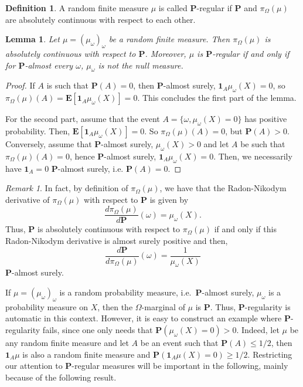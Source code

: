 \documentclass{amsart}
\newtheorem{lem}[thm]{Lemma}
\theoremstyle{definition}
\newtheorem{defn}[thm]{Definition}
\theoremstyle{remark}
\newtheorem{rem}[thm]{Remark}
\begin{document}
\begin{defn}
A random finite measure $\mu$ is called $\mathbf P$-regular if $\mathbf P$ and $\pi_\Omega(\mu)$ are absolutely continuous with respect to each other.
\end{defn}


\begin{lem}
Let $\mu=(\mu_\omega)_\omega$ be a random finite measure.
Then $\pi_\Omega(\mu)$ is absolutely continuous with respect to $\mathbf P$.
Moreover, $\mu$ is $\mathbf P$-regular if and only if for $\mathbf P$-almost every $\omega$, $\mu_\omega$ is not the null measure.
\end{lem}

\begin{proof}
If $A$ is  such that $\mathbf P(A)=0$, then $\mathbf P$-almost surely, $\mathbf 1_A \mu_\omega(X)=0$, so $\pi_\Omega(\mu)(A)=\mathbf E[\mathbf 1_A\mu_\omega(X)]=0$.
This concludes the first part of the lemma.

For the second part, assume that the event $A=\{\omega,\mu_\omega(X)=0\}$ has positive probability.
Then, $\mathbf E[\mathbf 1_A \mu_\omega(X)]=0$.
So $\pi_\Omega(\mu)(A)=0$, but $\mathbf P(A)>0$.
Conversely, assume that $\mathbf{P}$-almost surely, $\mu_\omega(X)>0$ and let $A$ be such that
$\pi_\Omega(\mu)(A)=0$, hence $\mathbf P$-almost surely, $\mathbf 1_A \mu_\omega(X)=0$.
Then, we necessarily have $\mathbf 1_A=0$ $\mathbf P$-almost surely, i.e. $\mathbf P(A)=0$. 
\end{proof}

\begin{rem}
In fact, by definition of $\pi_\Omega(\mu)$, we have that the Radon-Nikodym derivative of $\pi_\Omega(\mu)$ with respect to $\mathbf P$ is given by
$$\frac{d\pi_\Omega(\mu)}{d\mathbf P}(\omega)=\mu_\omega(X).$$
Thus, $\mathbf P$ is absolutely continuous with respect to $\pi_\Omega(\mu)$ if and only if this Radon-Nikodym derivative is almost surely positive and then,
$$\frac{d\mathbf P}{d\pi_\Omega(\mu)}(\omega)=\frac{1}{\mu_\omega(X)}$$
$\mathbf P$-almost surely.
\end{rem}

If $\mu=(\mu_\omega)_\omega$ is a random probability measure, i.e.\ $\mathbf P$-almost surely, $\mu_\omega$ is a probability measure on $X$, then the $\Omega$-marginal of $\mu$ is $\mathbf P$.
Thus, $\mathbf P$-regularity is automatic in this context.
However, it is easy to construct an example where $\mathbf P$-regularity fails, since one only needs that $\mathbf P(\mu_\omega(X)=0)>0$.
Indeed, let $\mu$ be any random finite measure and let $A$ be an event such that $\mathbf P(A)\leq 1/2$, then $\mathbf 1_A\mu$ is also a random finite measure and
$\mathbf P(\mathbf 1_A\mu(X)=0)\geq 1/2$.
Restricting our attention to $\mathbf P$-regular measures will be important in the following, mainly because of the following result.
\end{document}
